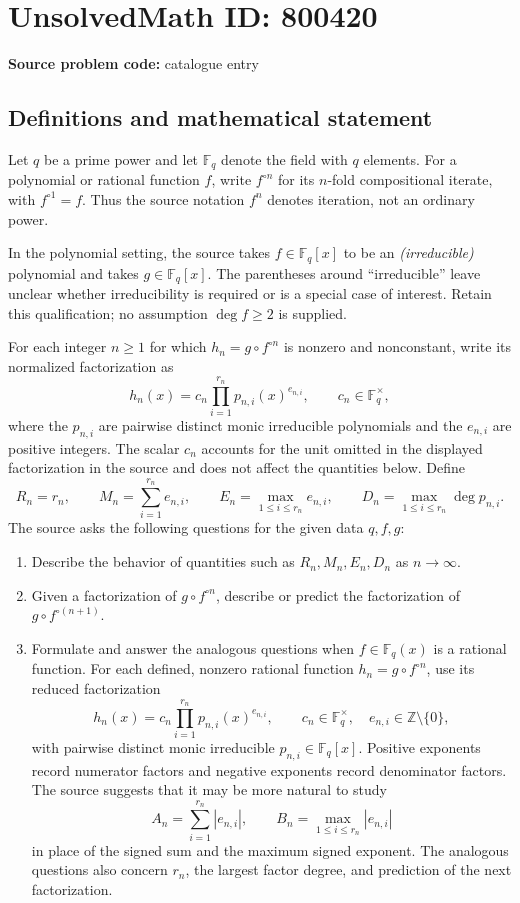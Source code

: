 \documentclass[11pt]{article}
\newcommand{\Z}{\mathbb{Z}}
\newcommand{\F}{\mathbb{F}}
\begin{document}
\section*{UnsolvedMath ID: 800420}
\textbf{Source problem code:} catalogue entry
\subsection{Definitions and mathematical statement}
Let \(q\) be a prime power and let \(\F_q\) denote the field with \(q\) elements. For a polynomial or rational function \(f\), write \(f^{\circ n}\) for its \(n\)-fold compositional iterate, with \(f^{\circ 1}=f\). Thus the source notation \(f^n\) denotes iteration, not an ordinary power.

In the polynomial setting, the source takes \(f\in\F_q[x]\) to be an \emph{(irreducible)} polynomial and takes \(g\in\F_q[x]\). The parentheses around ``irreducible'' leave unclear whether irreducibility is required or is a special case of interest. Retain this qualification; no assumption \(\deg f\ge2\) is supplied.

For each integer \(n\ge1\) for which \(h_n=g\circ f^{\circ n}\) is nonzero and nonconstant, write its normalized factorization as
\[
 h_n(x)=c_n\prod_{i=1}^{r_n}p_{n,i}(x)^{e_{n,i}},
 \qquad c_n\in\F_q^\times,
\]
where the \(p_{n,i}\) are pairwise distinct monic irreducible polynomials and the \(e_{n,i}\) are positive integers. The scalar \(c_n\) accounts for the unit omitted in the displayed factorization in the source and does not affect the quantities below. Define
\[
 R_n=r_n,\qquad
 M_n=\sum_{i=1}^{r_n}e_{n,i},\qquad
 E_n=\max_{1\le i\le r_n}e_{n,i},\qquad
 D_n=\max_{1\le i\le r_n}\deg p_{n,i}.
\]
The source asks the following questions for the given data \(q,f,g\):
\begin{enumerate}
\item[(a)] Describe the behavior of quantities such as \(R_n,M_n,E_n,D_n\) as \(n\to\infty\).
\item[(b)] Given a factorization of \(g\circ f^{\circ n}\), describe or predict the factorization of \(g\circ f^{\circ(n+1)}\).
\item[(c)] Formulate and answer the analogous questions when \(f\in\F_q(x)\) is a rational function. For each defined, nonzero rational function \(h_n=g\circ f^{\circ n}\), use its reduced factorization
\[
 h_n(x)=c_n\prod_{i=1}^{r_n}p_{n,i}(x)^{e_{n,i}},
 \qquad c_n\in\F_q^\times,\quad
 e_{n,i}\in\Z\setminus\{0\},
\]
with pairwise distinct monic irreducible \(p_{n,i}\in\F_q[x]\). Positive exponents record numerator factors and negative exponents record denominator factors. The source suggests that it may be more natural to study
\[
 A_n=\sum_{i=1}^{r_n}|e_{n,i}|,
 \qquad
 B_n=\max_{1\le i\le r_n}|e_{n,i}|
\]
in place of the signed sum and the maximum signed exponent. The analogous questions also concern \(r_n\), the largest factor degree, and prediction of the next factorization.
\end{enumerate}
\end{document}
